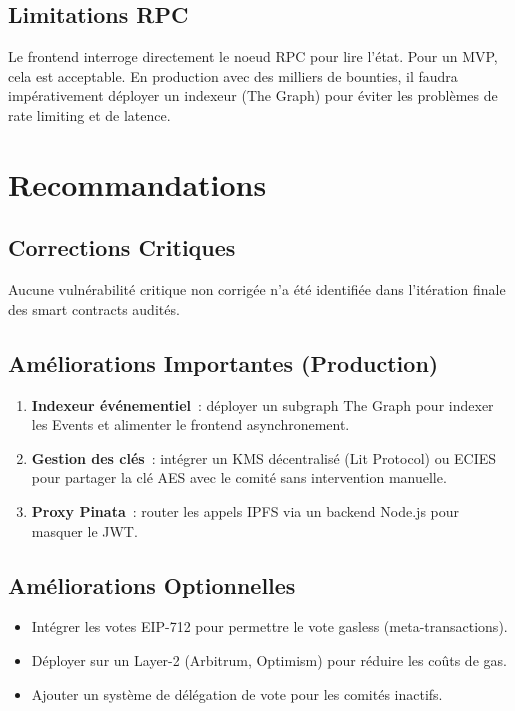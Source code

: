 \documentclass[12pt, a4paper]{report}
\begin{document}
\section{Limitations RPC}
Le frontend interroge directement le noeud RPC pour lire l'\'{e}tat. Pour un MVP, cela est acceptable. En production avec des milliers de bounties, il faudra imp\'{e}rativement d\'{e}ployer un indexeur (The Graph) pour \'{e}viter les probl\`{e}mes de rate limiting et de latence.

\chapter{Recommandations}

\section{Corrections Critiques}
Aucune vuln\'{e}rabilit\'{e} critique non corrig\'{e}e n'a \'{e}t\'{e} identifi\'{e}e dans l'it\'{e}ration finale des smart contracts audit\'{e}s.

\section{Am\'{e}liorations Importantes (Production)}
\begin{enumerate}
    \item \textbf{Indexeur \'{e}v\'{e}nementiel}~: d\'{e}ployer un subgraph The Graph pour indexer les Events et alimenter le frontend asynchronement.
    \item \textbf{Gestion des cl\'{e}s}~: int\'{e}grer un KMS d\'{e}centralis\'{e} (Lit Protocol) ou ECIES pour partager la cl\'{e} AES avec le comit\'{e} sans intervention manuelle.
    \item \textbf{Proxy Pinata}~: router les appels IPFS via un backend Node.js pour masquer le JWT.
\end{enumerate}

\section{Am\'{e}liorations Optionnelles}
\begin{itemize}
    \item Int\'{e}grer les votes EIP-712 pour permettre le vote gasless (meta-transactions).
    \item D\'{e}ployer sur un Layer-2 (Arbitrum, Optimism) pour r\'{e}duire les co\^{u}ts de gas.
    \item Ajouter un syst\`{e}me de d\'{e}l\'{e}gation de vote pour les comit\'{e}s inactifs.
\end{itemize}
\end{document}
